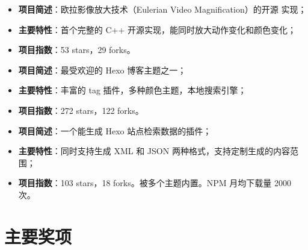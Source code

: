 \documentclass[11pt,a4paper,nolmodern]{moderncv}
\begin{document}
%
  {
\begin{itemize}
\item \textbf{项目简述}：欧拉影像放大技术（Eulerian Video Magnification）的开源
  实现；
\item \textbf{主要特性}：首个完整的 C++ 开源实现，能同时放大动作变化和颜色变化；
\item \textbf{项目指数}：53 stars，29 forks。
\end{itemize}}

%
  {
\begin{itemize}
\item \textbf{项目简述}：最受欢迎的 Hexo 博客主题之一；
\item \textbf{主要特性}：丰富的 tag 插件，多种颜色主题，本地搜索引擎；
\item \textbf{项目指数}：272 stars，122 forks。
\end{itemize}}

%
  {
\begin{itemize}
\item \textbf{项目简述}：一个能生成 Hexo 站点检索数据的插件；
\item \textbf{主要特性}：同时支持生成 XML 和
  JSON 两种格式，支持定制生成的内容范围；
\item \textbf{项目指数}：103 stars，18 forks。被多个主题内置。NPM 月均下载量 2000 次。
\end{itemize}}

\section{\hei 主要奖项}

\end{document}
